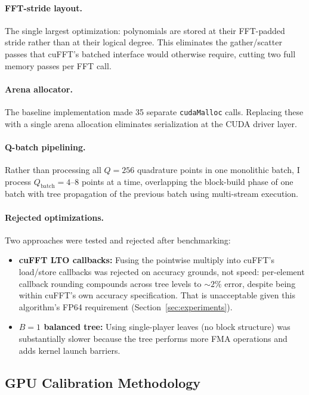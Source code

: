 \documentclass[11pt]{article}
\begin{document}
\paragraph{FFT-stride layout.}
The single largest optimization: polynomials are stored at their
FFT-padded stride rather than at their logical degree. This eliminates
the gather/scatter passes that cuFFT's batched interface would otherwise
require, cutting two full memory passes per FFT call.

\paragraph{Arena allocator.}
The baseline implementation made 35 separate \texttt{cudaMalloc} calls.
Replacing these with a single arena allocation eliminates serialization
at the CUDA driver layer.

\paragraph{Q-batch pipelining.}
Rather than processing all $Q = 256$ quadrature points in one monolithic
batch, I process $Q_{\text{batch}} = 4$--$8$ points at a time, overlapping
the block-build phase of one batch with tree propagation of the previous
batch using multi-stream execution.

\paragraph{Rejected optimizations.}
Two approaches were tested and rejected after benchmarking:
\begin{itemize}
  \item \textbf{cuFFT LTO callbacks:} Fusing the pointwise multiply into
    cuFFT's load/store callbacks was rejected on accuracy grounds, not
    speed: per-element callback rounding compounds across tree levels to
    ${\sim}2\%$ error, despite being within cuFFT's own accuracy
    specification. That is unacceptable given this algorithm's FP64
    requirement (Section~\ref{sec:experiments}).
  \item \textbf{$B = 1$ balanced tree:} Using single-player leaves (no
    block structure) was substantially slower because the tree performs
    more FMA operations and adds kernel launch barriers.
\end{itemize}

\subsection{GPU Calibration Methodology}\label{sec:gpu-calib-methodology}
\end{document}
